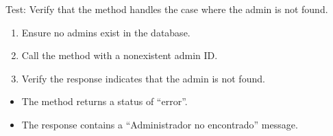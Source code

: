 \documentclass[letterpaper,10pt,english]{sphinxmanual}
\begin{document}
\begin{fulllineitems}
\label{\detokenize{test:test.test_admin.test_update_admin_password_not_found}}
\pysigstartsignatures
\pysiglinewithargsret
{}
{}
{}
\pysigstopsignatures
\sphinxAtStartPar
Test: Verify that the method handles the case where the admin is not found.
\begin{description}
\begin{enumerate}
%
\item {} 
\sphinxAtStartPar
Ensure no admins exist in the database.

\item {} 
\sphinxAtStartPar
Call the  method with a non\sphinxhyphen{}existent admin ID.

\item {} 
\sphinxAtStartPar
Verify the response indicates that the admin is not found.

\end{enumerate}

\begin{itemize}
\item {} 
\sphinxAtStartPar
The method returns a status of “error”.

\item {} 
\sphinxAtStartPar
The response contains a “Administrador no encontrado” message.

\end{itemize}

\end{description}

\end{fulllineitems}

\end{document}
